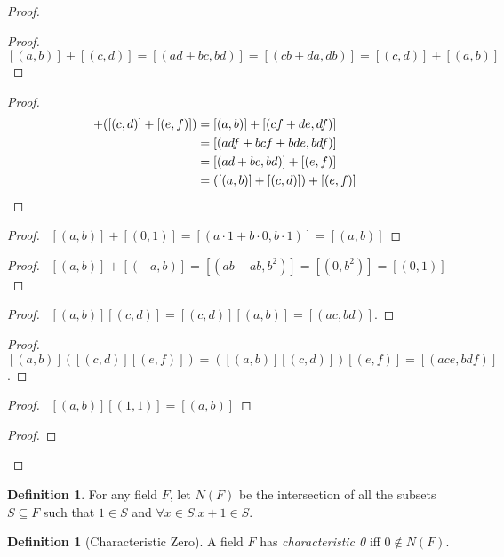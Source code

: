 \documentclass{book}
\let\qed\relax
\theoremstyle{definition}
\newtheorem{df}[ax]{Definition}
\begin{document}
\begin{proof}
\begin{proof}
\pf\ $[(a,b)] + [(c,d)] = [(ad+bc,bd)] = [(cb+da,db)] = [(c,d)] + [(a,b)]$ \qed
\end{proof}
\begin{proof}
\pf
\begin{align*}
[(a,b)] + ([(c,d)] + [(e,f)]) & = [(a,b)] + [(cf+de,df)] \\
& = [(adf + bcf + bde,bdf)] \\
& = [(ad+bc,bd)] + [(e,f)] \\
& = ([(a,b)] + [(c,d)]) + [(e,f)] & \qed
\end{align*}
\end{proof}
\begin{proof}
\pf\ $[(a,b)] + [(0,1)] = [(a \cdot 1 + b \cdot 0, b \cdot 1)] = [(a,b)]$ \qed
\end{proof}
\begin{proof}
\pf\ $[(a,b)] + [(-a,b)] = [(ab-ab,b^2)] = [(0,b^2)] = [(0,1)]$ \qed
\end{proof}
\begin{proof}
\pf\ $[(a,b)][(c,d)] = [(c,d)][(a,b)] = [(ac,bd)]$. \qed
\end{proof}
\begin{proof}
\pf\ $[(a,b)]([(c,d)][(e,f)]) = ([(a,b)][(c,d)])[(e,f)] = [(ace,bdf)]$. \qed
\end{proof}
\begin{proof}
\pf\ $[(a,b)][(1,1)] = [(a,b)]$ \qed
\end{proof}
\begin{proof}
\pf
{}
\qed
\end{proof}
\qed
\end{proof}

\begin{df}
For any field $F$, let $N(F)$ be the intersection of all the subsets $S \subseteq F$ such that $1 \in S$ and $\forall x \in S. x + 1 \in S$.
\end{df}

\begin{df}[Characteristic Zero]
A field $F$ has \emph{characteristic 0} iff $0 \notin N(F)$.
\end{df}
\end{document}
